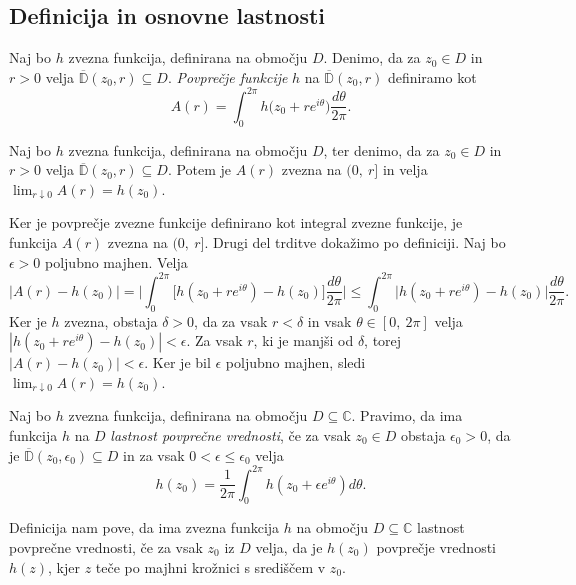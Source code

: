 \documentclass[mat1, tisk]{fmfdelo}
\begin{document}
\subsection{Definicija in osnovne lastnosti}
    \begin{definicija}  
        Naj bo $h$ zvezna funkcija, definirana na območju $D$. Denimo, da za $z_0 \in D$ in $r > 0$ velja $\overline{\mathbb{D}}(z_0, r) \subseteq D$. \emph{Povprečje funkcije} $h$ na $\overline{\mathbb{D}}(z_0, r)$ definiramo kot
        $$
            A(r) = \int_{0}^{2 \pi}{h \big(z_0 + r e^{i\theta}\big)\frac{d\theta}{2 \pi}}.
        $$
    \end{definicija}
    \begin{trditev}
        \label{zvpov}
        Naj bo $h$ zvezna funkcija, definirana na območju $D$, ter denimo, da za $z_0 \in D$ in $r > 0$ velja $\overline{\mathbb{D}}(z_0, r) \subseteq D$. 
        Potem je $A(r)$ zvezna na $(0,~r]$ in velja $\lim_{r \downarrow 0}{A(r)} = h(z_0)$.
    \end{trditev}
    \begin{dokaz}
        Ker je povprečje zvezne funkcije definirano kot integral zvezne funkcije, je funkcija $A(r)$ zvezna na $(0,~r]$. Drugi del trditve dokažimo po definiciji.
        Naj bo $\epsilon > 0$ poljubno majhen. Velja
        $$
            |A(r) - h(z_0)| = \bigg|\int_{0}^{2\pi} \big[h(z_0 + r e^{i\theta})  - h(z_0)\big] \frac{d\theta}{2\pi} \bigg| \leq \int_{0}^{2 \pi} \big| h(z_0 + r e^{i\theta}) - h(z_0) \big| \frac{d\theta}{2 \pi}.
        $$
        Ker je $h$ zvezna, obstaja $\delta > 0$, da za vsak $r < \delta$ in vsak $\theta \in [0,~2\pi]$ velja \mbox{$|h(z_0 + r e^{i\theta}) - h(z_0)| < \epsilon$}.
        Za vsak $r$, ki je manjši od $\delta$, torej $|A(r) - h(z_0)| < \epsilon$. Ker je bil $\epsilon$ poljubno majhen, sledi $\lim_{r \downarrow 0}{A(r)} = h(z_0)$.
    \end{dokaz}

    \begin{definicija}
        Naj bo $h$ zvezna funkcija, definirana na območju $D \subseteq \mathbb{C}$. Pravimo, da ima funkcija $h$ na $D$ \emph{lastnost povprečne vrednosti}, če za vsak $z_0 \in D$ obstaja $\epsilon_0 > 0$, da je $\overline{\mathbb{D}}(z_0, \epsilon_0) \subseteq D$ in za vsak $0 < \epsilon \leq \epsilon_0 $ velja
        $$
            h(z_0) = \frac{1}{2 \pi} \int_{0}^{2 \pi}{h(z_0 + \epsilon e^{i \theta}) d\theta}.
        $$
    \end{definicija}
    \begin{opomba}
        Definicija nam pove, da ima zvezna funkcija $h$ na območju $D \subseteq \mathbb{C}$ lastnost povprečne vrednosti, če za vsak $z_0$ iz $D$ velja, 
        da je $h(z_0)$ povprečje vrednosti $h(z)$, kjer $z$ teče po majhni krožnici s središčem v $z_0$.
    \end{opomba}
\end{document}
